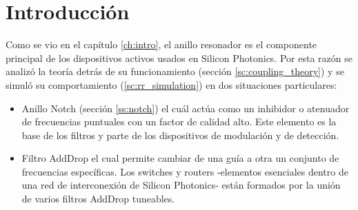\section{Introducción}
Como se vio en el capítulo \ref{ch:intro}, el anillo resonador es el componente principal 
de los dispositivos activos usados en Silicon Photonics. 
Por esta razón se analizó la teoría detrás de su funcionamiento 
(sección \ref{sc:coupling_theory}) y se simuló su comportamiento (\ref{sc:rr_simulation}) 
en dos situaciones particulares:

\begin{itemize}
\item Anillo Notch (sección \ref{ss:notch}) el cuál actúa como un inhibidor o atenuador de 
frecuencias puntuales con un factor de calidad alto. 
Este elemento es la base de los filtros y parte de los dispositivos de modulación y
de detección.

\item Filtro AddDrop el cual permite cambiar de una guía a otra un conjunto de 
frecuencias específicas. Los switches y routers 
-elementos esenciales dentro de una red de interconexión de Silicon Photonics- 
están formados por la unión de varios filtros AddDrop tuneables.

\end{itemize} 
